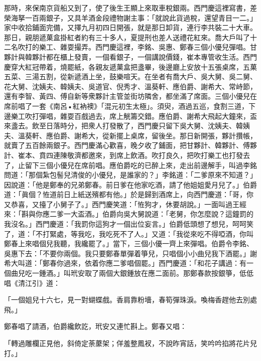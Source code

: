 那時，來保南京貨船又到了，使了後生王顯上來取車稅銀兩。西門慶這裡寫書，差榮海拏一百兩銀子，又具羊酒金段禮物謝主事：「就說此貨過稅，還望青目一二。」家中收拾鋪面完備，又擇九月初四日開張，就是那日卸貨，連行李共裝二十大車。那日，親朋遞菓盒掛紅者約有三十多人，夏提刑也差人送禮花紅來。喬大戶叫了十二名吹打的樂工、雜耍撮弄。西門慶這裡，李銘、吳惠、鄭春三個小優兒彈唱。甘夥計與韓夥計都在櫃上發賣，一個看銀子，一個講說價錢，崔本專管收生活。西門慶穿大紅冠帶着，燒罷紙，{}各親友遞菓盒把盞畢，後邊廳上安放十五張桌席，五菓五菜、三湯五割，從新遞酒上坐，鼓樂喧天。在坐者有喬大戶、吳大舅、吳二舅、花大舅、沈姨夫、韓姨夫、吳道官、倪秀才、溫葵軒、應伯爵、謝希大、常峙節，還有李智、黃四、傅自新等衆夥計主管並街坊隣舍，都坐滿了席面。三個小優兒在席前唱了一套《南呂•紅衲襖》「混元初生太極」。{}須臾，酒過五巡，食割三道，下邊樂工吹打彈唱，雜耍百戲過去，席上觥籌交錯。應伯爵、謝希大飛起大鐘來，盃來盞去。飲至日落時分，把衆人打發散了，西門慶只留下吳大舅、沈姨夫、韓姨夫、溫葵軒、應伯爵、謝希大，從新擺上桌席，留後坐。那日新開張，夥計攢帳，就賣了五百餘兩銀子。西門慶滿心歡喜，晚夕收了鋪面，把甘夥計、韓夥計、傅夥計、崔本、賁四連陳敬濟都邀來，到席上飲酒。吹打良久，把吹打樂工也打發去了，止留下三個小優兒在席前唱。應伯爵吃的已醉上來，走出前邊解手，叫過李銘問道：「那個紮包髻兒清俊的小優兒，是誰家的？」李銘道：「二爹原來不知道？」因說道：「他是鄭奉的兄弟鄭春。前日爹在他家吃酒，請了他姐姐愛月兒了。」伯爵道：「眞個？恠道前日上紙送殯都有他。」於是歸到酒席上，向西門慶道：「哥，你又恭喜，又擡了小舅子了。」西門慶笑道：「恠狗才，休要胡說。」一面叫過王經來：「斟與你應二爹一大盃酒。」伯爵向吳大舅說道：「老舅，你怎麼說？這鐘罰的我沒名。」西門慶道：「我罰你這狗才一個出位妄言。」伯爵低頭想了想兒，呵呵笑了，道：「不打緊處，等我吃，我吃死不了人。」又道：「我從來吃不得啞酒，你叫鄭春上來唱個兒我聽，我纔罷了。」當下，三個小優一齊上來彈唱。伯爵令李銘、吳惠下去：「不要你兩個。我只要鄭春單彈着箏兒，只唱個小小曲兒我下酒罷。」{}謝希大叫道：「鄭春你過來，依着你應二爹唱個罷。」西門慶道：「和花子講過：有一個曲兒吃一鍾酒。」叫玳安取了兩個大銀鍾放在應二面前。那鄭春款按銀箏，低低唱《清江引》道：{}

\begin{myquote}
「一個姐兒十六七，見一對蝴蝶戲。香肩靠粉墻，春筍彈珠淚。喚梅香趕他去別處飛。」
\end{myquote}

鄭春唱了請酒，伯爵纔飲訖，玳安又連忙斟上。鄭春又唱：

\begin{myquote}
「轉過雕欄正見他，斜倚定荼䕷架；佯羞整鳳衩，不說昨宵話，笑吟吟掐將花片兒打。」{}
\end{myquote}

